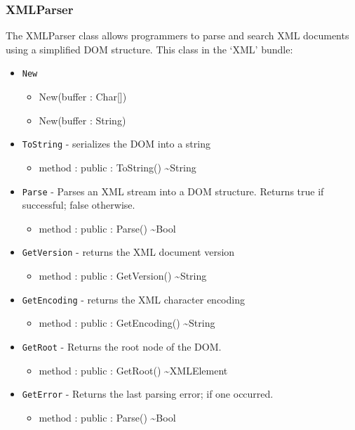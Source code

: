 \documentclass[12pt]{article}
\begin{document}
\subsubsection{XMLParser}
The XMLParser class allows programmers to parse and search XML
documents using a simplified DOM structure.  This class in the `XML'
bundle:
\begin{itemize}
\item \texttt{New}
  \begin{itemize}
  \item New(buffer : Char[])
  \item New(buffer : String)
  \end{itemize}
\item \texttt{ToString} - serializes the DOM into a string
  \begin{itemize}
  \item method : public : ToString() \textasciitilde String
  \end{itemize}
\item \texttt{Parse} - Parses an XML stream into a DOM structure.
  Returns true if successful; false otherwise.
  \begin{itemize}
  \item method : public : Parse() \textasciitilde Bool
  \end{itemize}
\item \texttt{GetVersion} - returns the XML document version
  \begin{itemize}
  \item method : public : GetVersion() \textasciitilde String
  \end{itemize}
\item \texttt{GetEncoding} - returns the XML character encoding
  \begin{itemize}
  \item method : public : GetEncoding() \textasciitilde String
  \end{itemize}
\item \texttt{GetRoot} - Returns the root node of the DOM.
  \begin{itemize}
  \item method : public : GetRoot() \textasciitilde XMLElement
  \end{itemize}
\item \texttt{GetError} - Returns the last parsing error; if one
  occurred.
  \begin{itemize}
  \item method : public : Parse() \textasciitilde Bool
  \end{itemize}
\end{itemize}
\end{document}
